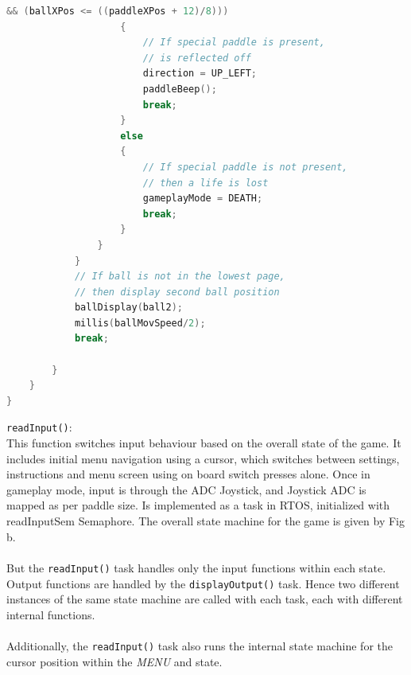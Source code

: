 \documentclass{article}
\begin{document}
\begin{lstlisting}[basicstyle = \small, language = C]
                    && (ballXPos <= ((paddleXPos + 12)/8)))
                    {
                        // If special paddle is present, 
                        // is reflected off
                        direction = UP_LEFT;
                        paddleBeep();
                        break;
                    }
                    else
                    {
                        // If special paddle is not present, 
                        // then a life is lost
                        gameplayMode = DEATH;
                        break;
                    }
                }
            }
            // If ball is not in the lowest page, 
            // then display second ball position
            ballDisplay(ball2);
            millis(ballMovSpeed/2);
            break;

        }
    }
}
  \end{lstlisting}
\texttt{readInput()}: \\ This function switches input behaviour based on the overall state of the game. It includes initial menu navigation using a cursor, which switches between settings, instructions and menu screen using on board switch presses alone. Once in gameplay mode, input is through the ADC Joystick, and Joystick ADC is mapped as per paddle size. Is implemented as a task in RTOS, initialized with readInputSem Semaphore. The overall state machine for the game is given by Fig b. \\
\\ \qquad But the \texttt{readInput()} task handles only the input functions within each state. Output functions are handled by the \texttt{displayOutput()} task. Hence two different instances of the same state machine are called with each task, each with different internal functions. \\
\\ \qquad Additionally, the \texttt{readInput()} task also runs the internal state machine for the cursor position within the \textit{MENU} and  state.
\end{document}
